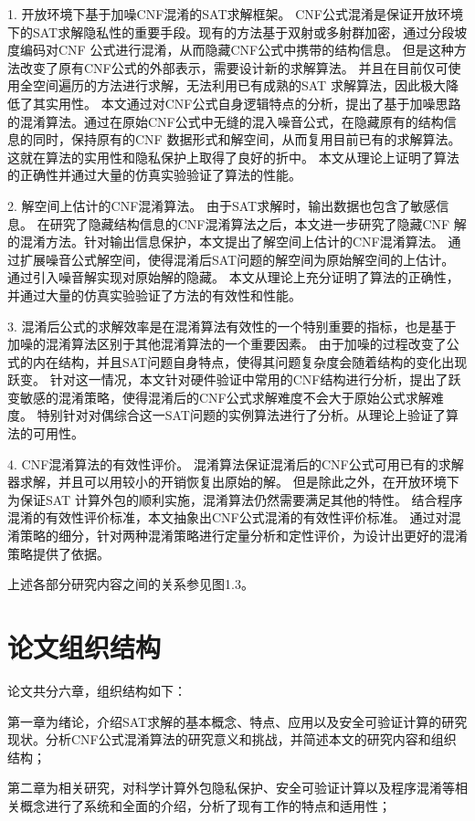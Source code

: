 1. 开放环境下基于加噪CNF混淆的SAT求解框架。
CNF公式混淆是保证开放环境下的SAT求解隐私性的重要手段。现有的方法基于双射或多射群加密，通过分段坡度编码对CNF 公式进行混淆，从而隐藏CNF公式中携带的结构信息。
但是这种方法改变了原有CNF公式的外部表示，需要设计新的求解算法。
并且在目前仅可使用全空间遍历的方法进行求解，无法利用已有成熟的SAT 求解算法，因此极大降低了其实用性。
本文通过对CNF公式自身逻辑特点的分析，提出了基于加噪思路的混淆算法。通过在原始CNF公式中无缝的混入噪音公式，在隐藏原有的结构信息的同时，保持原有的CNF 数据形式和解空间，从而复用目前已有的求解算法。
这就在算法的实用性和隐私保护上取得了良好的折中。
本文从理论上证明了算法的正确性并通过大量的仿真实验验证了算法的性能。

2. 解空间上估计的CNF混淆算法。
由于SAT求解时，输出数据也包含了敏感信息。
在研究了隐藏结构信息的CNF混淆算法之后，本文进一步研究了隐藏CNF 解的混淆方法。针对输出信息保护，本文提出了解空间上估计的CNF混淆算法。
通过扩展噪音公式解空间，使得混淆后SAT问题的解空间为原始解空间的上估计。
通过引入噪音解实现对原始解的隐藏。
本文从理论上充分证明了算法的正确性，并通过大量的仿真实验验证了方法的有效性和性能。

3. 混淆后公式的求解效率是在混淆算法有效性的一个特别重要的指标，也是基于加噪的混淆算法区别于其他混淆算法的一个重要因素。
由于加噪的过程改变了公式的内在结构，并且SAT问题自身特点，使得其问题复杂度会随着结构的变化出现跃变。
针对这一情况，本文针对硬件验证中常用的CNF结构进行分析，提出了跃变敏感的混淆策略，使得混淆后的CNF公式求解难度不会大于原始公式求解难度。
特别针对对偶综合这一SAT问题的实例算法进行了分析。从理论上验证了算法的可用性。

4. CNF混淆算法的有效性评价。
混淆算法保证混淆后的CNF公式可用已有的求解器求解，并且可以用较小的开销恢复出原始的解。
但是除此之外，在开放环境下为保证SAT 计算外包的顺利实施，混淆算法仍然需要满足其他的特性。
结合程序混淆的有效性评价标准，本文抽象出CNF公式混淆的有效性评价标准。
通过对混淆策略的细分，针对两种混淆策略进行定量分析和定性评价，为设计出更好的混淆策略提供了依据。

上述各部分研究内容之间的关系参见图1.3。
\section{论文组织结构}
论文共分六章，组织结构如下：

第一章为绪论，介绍SAT求解的基本概念、特点、应用以及安全可验证计算的研究现状。分析CNF公式混淆算法的研究意义和挑战，并简述本文的研究内容和组织结构；

第二章为相关研究，对科学计算外包隐私保护、安全可验证计算以及程序混淆等相关概念进行了系统和全面的介绍，分析了现有工作的特点和适用性；

